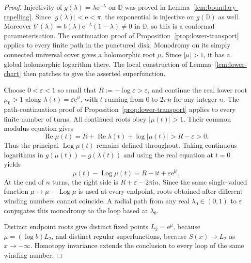 \documentclass[11pt]{amsart}
\theoremstyle{definition}
\newcommand{\eee}{\mathrm{e}}
\newcommand{\ii}{\mathrm{i}}
\begin{document}
\begin{proof}
Injectivity of $g(\lambda)=\lambda\eee^{-\lambda}$ on $\mathbb D$ was
proved in Lemma~\ref{lem:boundary-repelling}.  Since $|g(\lambda)|<\eee<\pi$,
the exponential is injective on $g(\mathbb D)$ as well.  Moreover
$b'(\lambda)=b(\lambda)\eee^{-\lambda}(1-\lambda)\ne0$ in $\mathbb D$,
so this is a conformal parameterisation.
The continuation proof of Proposition~\ref{prop:lower-transport}
applies to every finite path in the punctured disk.  Monodromy on its
simply connected universal cover gives a holomorphic root $\mu$.
Since $|\mu|>1$, it has a global holomorphic logarithm there.
The local construction of Lemma~\ref{lem:lower-chart} then patches
to give the asserted superfunction.

Choose $0<\varepsilon<1$ so small that
$R:=-\log\varepsilon>\varepsilon$, and continue the real lower root
$\mu_0>1$ along $\lambda(t)=\varepsilon\eee^{\ii t}$, with $t$
running from $0$ to $2\pi n$ for any integer $n$.  The
path-continuation proof of
Proposition~\ref{prop:lower-transport} applies to every finite number
of turns.  All continued roots obey $|\mu(t)|>1$.  Their common
modulus equation gives
\[
 \operatorname{Re}\mu(t)
 =R+\operatorname{Re}\lambda(t)+\log|\mu(t)|
 >R-\varepsilon>0.
\]
Thus the principal $\operatorname{Log}\mu(t)$ remains defined throughout.  Taking
continuous logarithms in $g(\mu(t))=g(\lambda(t))$ and using the real
equation at $t=0$ yields
\[
 \mu(t)-\operatorname{Log}\mu(t)
   =R-\ii t+\varepsilon\eee^{\ii t}.
\]
At the end of $n$ turns, the right side is
$R+\varepsilon-2\pi\ii n$.  Since the same single-valued function
$\mu\mapsto\mu-\operatorname{Log}\mu$ is used at every endpoint, roots obtained
after different winding numbers cannot coincide.  A radial path from
any real $\lambda_0\in(0,1)$ to $\varepsilon$ conjugates this
monodromy to the loop based at $\lambda_0$.

Distinct endpoint roots give distinct fixed points $L_2=\eee^\mu$,
because $\mu=(\log b)L_2$, and distinct regular superfunctions,
because $S(x)\to L_2$ as $x\to-\infty$.  Homotopy invariance extends
the conclusion to every loop of the same winding number.
\end{proof}
\end{document}

